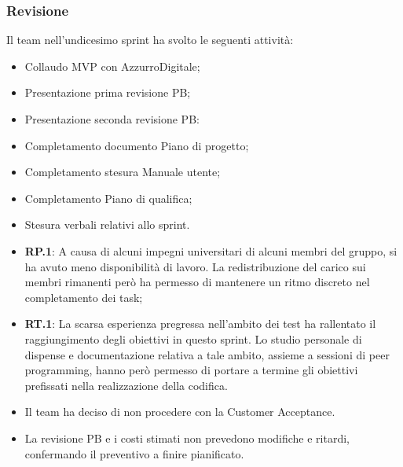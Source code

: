 \documentclass[10pt, a4paper]{article}
\begin{document}
\subsubsection{Revisione}
Il team nell'undicesimo sprint ha svolto le seguenti attività:
\begin{itemize}
    \item Collaudo MVP con AzzurroDigitale;
    \item Presentazione prima revisione PB;
    \item Presentazione seconda revisione PB:
    \item Completamento documento Piano di progetto;
    \item Completamento stesura Manuale utente;
    \item Completamento Piano di qualifica;
    \item Stesura verbali relativi allo sprint.
\end{itemize}
\begin{itemize}
    \item \textbf{RP.1}: A causa di alcuni impegni universitari di alcuni membri del gruppo, si ha avuto meno disponibilità di lavoro. La redistribuzione del carico sui membri rimanenti però ha permesso di mantenere un ritmo discreto nel completamento dei task;
    \item \textbf{RT.1}: La scarsa esperienza pregressa nell'ambito dei test ha rallentato il raggiungimento degli obiettivi in questo sprint. Lo studio personale di dispense e documentazione relativa a tale ambito, assieme a sessioni di peer programming, hanno però permesso di portare a termine gli obiettivi prefissati nella realizzazione della codifica.
\end{itemize}
\begin{itemize}
    \item Il team ha deciso di non procedere con la Customer Acceptance.
\end{itemize}
\begin{itemize}
    \item La revisione PB e i costi stimati non prevedono modifiche e ritardi, confermando il preventivo a finire pianificato.
\end{itemize}
\end{document}
